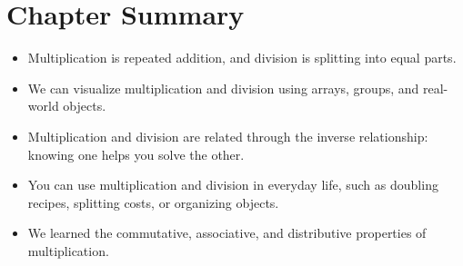 \section{Chapter Summary}
\begin{itemize}
    \item Multiplication is repeated addition, and division is splitting into equal parts.
    \item We can visualize multiplication and division using arrays, groups, and real-world objects.
    \item Multiplication and division are related through the inverse relationship: knowing one helps you solve the other.
    \item You can use multiplication and division in everyday life, such as doubling recipes, splitting costs, or organizing objects.
    \item We learned the commutative, associative, and distributive properties of multiplication.
\end{itemize}

